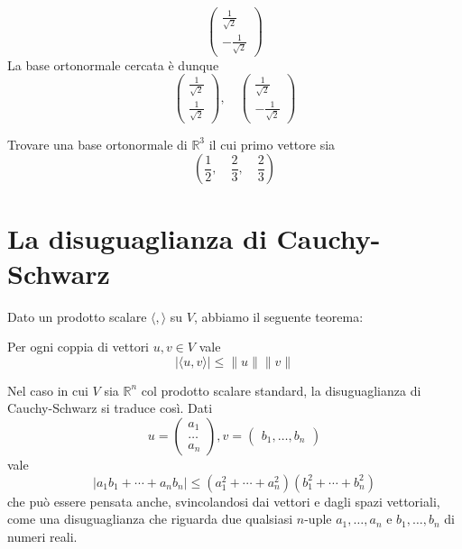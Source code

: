 \begin{example}
\[		\begin{pmatrix} \frac{1}{\sqrt{2}} \\ -\frac{1}{\sqrt{2}} \end{pmatrix}
	\]
	La base ortonormale cercata \`e dunque
	\[
		\begin{pmatrix} \frac{1}{\sqrt{2}} \\ \frac{1}{\sqrt{2}} \end{pmatrix}, \quad
		\begin{pmatrix} \frac{1}{\sqrt{2}} \\ -\frac{1}{\sqrt{2}} \end{pmatrix}
	\]
\end{example}

\begin{example}
	Trovare una base ortonormale di $\mathbb{R}^3$ il cui primo vettore sia
	\[ \left( \frac{1}{2}, \quad \frac{2}{3}, \quad \frac{2}{3} \right) \]
\end{example}

\section{La disuguaglianza di Cauchy-Schwarz}
Dato un prodotto scalare $\langle , \rangle$ su $V$, abbiamo il seguente
teorema:

\begin{theorem}
	Per ogni coppia di vettori $u, v \in V$ vale
	\begin{equation*}
		|\langle u, v \rangle| \leq \| u \| \| v \|
	\end{equation*}
\end{theorem}

\begin{example}
	Nel caso in cui $V$ sia $\mathbb{R}^n$ col prodotto scalare standard, la
	disuguaglianza di Cauchy-Schwarz si traduce cos\`i. Dati
	\begin{equation*}
		u = \begin{pmatrix}
			a_1 \\ \dots \\ a_n
		\end{pmatrix},
		v = \begin{pmatrix}
			b_1, \dots, b_n
		\end{pmatrix}
	\end{equation*}
	vale
	\begin{equation*}
		|a_1 b_1 + \cdots + a_n b_n| \leq
		(a_1^2 + \cdots + a_n^2)(b_1^2 + \cdots + b_n^2)
	\end{equation*}
	che pu\`o essere pensata anche, svincolandosi dai vettori e dagli spazi
	vettoriali, come una disuguaglianza che riguarda due qualsiasi $n$-uple
	$a_1, \dots, a_n$ e $b_1, \dots, b_n$ di numeri reali.
\end{example}

